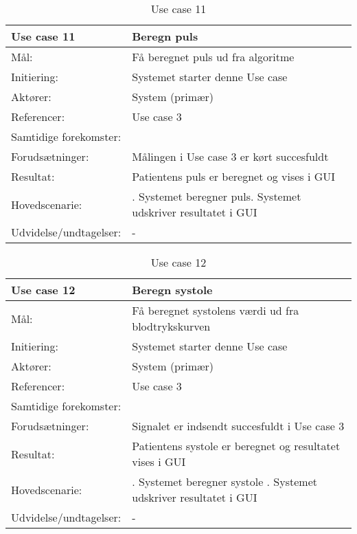 \begin{table}[h!]
\caption{Use case 11}\label{tab:tabel3}
\begin{tabular}{| l | >{\raggedright\arraybackslash}p{11cm} |}
   \hline
   \textbf{Use case 11} & \textbf{Beregn puls}\\ \hline
   Mål: & Få beregnet puls ud fra algoritme \\ \hline
   Initiering: & Systemet starter denne Use case\\ \hline
   Aktører:& System (primær)\\ \hline
   Referencer: & Use case 3 \\ \hline
   Samtidige forekomster: & \\\hline
   Forudsætninger: & Målingen i Use case 3 er kørt succesfuldt\\ \hline
   Resultat:& Patientens puls er beregnet og vises i GUI\\ \hline
   Hovedscenarie:& 
1. Systemet beregner puls\newline
2. Systemet udskriver resultatet i GUI\\\hline
Udvidelse/undtagelser: & -\\\hline
\end{tabular}
\end{table}


\begin{table}[h!]
\caption{Use case 12}\label{tab:tabel3}
\begin{tabular}{| l | >{\raggedright\arraybackslash}p{11cm} |}
   \hline
   \textbf{Use case 12} & \textbf{Beregn systole}\\ \hline
   Mål: & Få beregnet systolens værdi ud fra blodtrykskurven\\ \hline
   Initiering: & Systemet starter denne Use case\\ \hline
   Aktører:& System (primær)\\ \hline
   Referencer: & Use case 3\\ \hline
   Samtidige forekomster: & \\\hline
   Forudsætninger: & Signalet er indsendt succesfuldt i Use case 3 \\ \hline
   Resultat:& Patientens systole er beregnet og resultatet vises i GUI\\ \hline
   Hovedscenarie:& 
1. Systemet beregner systole \newline
2. Systemet udskriver resultatet i GUI \\\hline
Udvidelse/undtagelser: & -\\\hline
\end{tabular}
\end{table}


